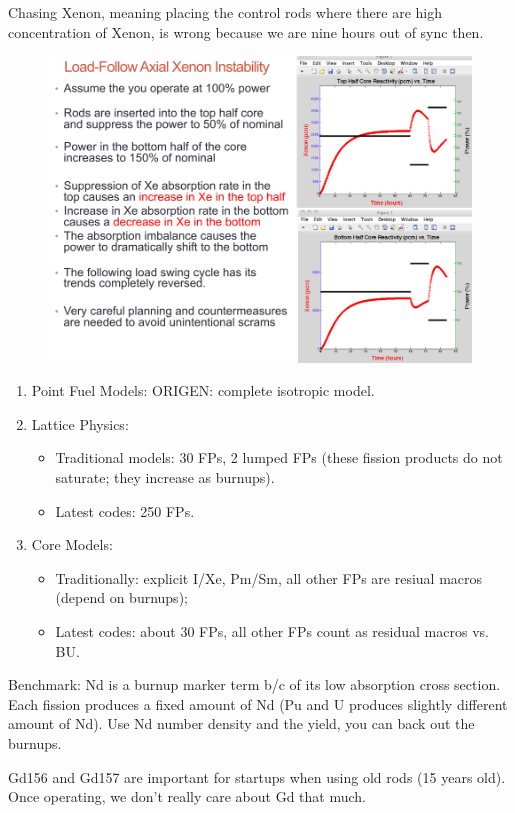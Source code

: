 \documentclass{school-22.211-notes}
\begin{document}
Chasing Xenon, meaning placing the control rods where there are high concentration of Xenon, is wrong because we are nine hours out of sync then. 
\begin{figure}[ht]
  \centering
  \includegraphics[width=5in]{images/dfs/axial-xenon-instability.png}
\end{figure}

\clearpage
{}
\begin{enumerate}
\item Point Fuel Models: ORIGEN: complete isotropic model. 
\item Lattice Physics: 
  \begin{itemize}
    \item Traditional models: 30 FPs, 2 lumped FPs (these fission products do not saturate; they increase as burnups).
    \item Latest codes: 250 FPs. 
  \end{itemize}
\item Core Models: 
  \begin{itemize}
    \item Traditionally: explicit I/Xe, Pm/Sm, all other FPs are resiual macros (depend on burnups);
    \item Latest codes: about 30 FPs, all other FPs count as residual macros vs. BU. 
  \end{itemize}
\end{enumerate}

Benchmark: Nd is a burnup marker term b/c of its low absorption cross section.   Each fission produces a fixed amount of Nd (Pu and U produces slightly different amount of Nd). Use Nd number density and the yield, you can back out the burnups. 

Gd156 and Gd157 are important for startups when using old rods (15 years old). Once operating, we don't really care about Gd that much. 
\end{document}

